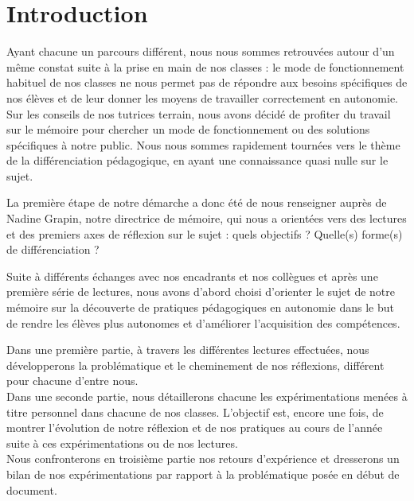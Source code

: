 \section{Introduction} %

Ayant chacune un parcours différent, nous nous sommes retrouvées autour d’un même constat suite à la prise en main de nos classes : le mode de fonctionnement habituel de nos classes ne nous permet pas de répondre aux besoins spécifiques de nos élèves et de leur donner les moyens de travailler correctement en autonomie. Sur les conseils de nos tutrices terrain, nous avons décidé de profiter du travail sur le mémoire pour chercher un mode de fonctionnement ou des solutions spécifiques à notre public. Nous nous sommes rapidement tournées vers le thème de la différenciation pédagogique, en ayant une connaissance quasi nulle sur le sujet.

La première étape de notre démarche a donc été de nous renseigner auprès de Nadine Grapin, notre directrice de mémoire, qui nous a orientées vers des lectures et des premiers axes de réflexion sur le sujet : quels objectifs ? Quelle(s) forme(s) de différenciation ?

Suite à différents échanges avec nos encadrants et nos collègues et après une première série de lectures, nous avons d'abord choisi d’orienter le sujet de notre mémoire sur la découverte de pratiques pédagogiques en autonomie dans le but de rendre les élèves plus autonomes et d'améliorer l'acquisition des compétences.

Dans une première partie, à travers les différentes lectures effectuées, nous développerons la problématique et le cheminement de nos réflexions, différent pour chacune d'entre nous. \\
Dans une seconde partie, nous détaillerons chacune les expérimentations menées à titre personnel dans chacune de nos classes. L'objectif est, encore une fois, de montrer l'évolution de notre réflexion et de nos pratiques au cours de l'année suite à ces expérimentations ou de nos lectures.\\
Nous confronterons en troisième partie nos retours d'expérience et dresserons un bilan de nos expérimentations par rapport à la problématique posée en début de document.

